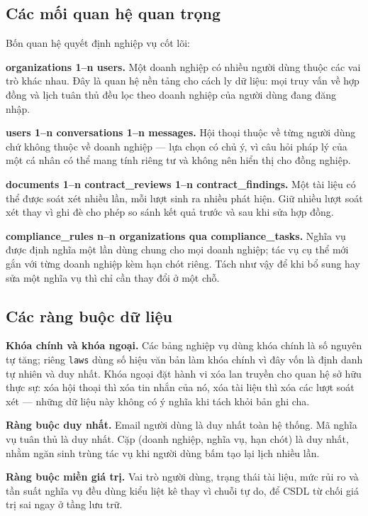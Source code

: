 \documentclass[12pt,a4paper]{report}
\numberwithin{equation}{chapter}
\numberwithin{figure}{chapter}
\numberwithin{table}{chapter}
\begin{document}
\subsection{Các mối quan hệ quan trọng}

Bốn quan hệ quyết định nghiệp vụ cốt lõi:

\textbf{organizations 1--n users.} Một doanh nghiệp có nhiều người dùng thuộc các
vai trò khác nhau. Đây là quan hệ nền tảng cho cách ly dữ liệu: mọi truy vấn về
hợp đồng và lịch tuân thủ đều lọc theo doanh nghiệp của người dùng đang đăng nhập.

\textbf{users 1--n conversations 1--n messages.} Hội thoại thuộc về từng người
dùng chứ không thuộc về doanh nghiệp --- lựa chọn có chủ ý, vì câu hỏi pháp lý của
một cá nhân có thể mang tính riêng tư và không nên hiển thị cho đồng nghiệp.

\textbf{documents 1--n contract\_reviews 1--n contract\_findings.} Một tài liệu có
thể được soát xét nhiều lần, mỗi lượt sinh ra nhiều phát hiện. Giữ nhiều lượt soát
xét thay vì ghi đè cho phép so sánh kết quả trước và sau khi sửa hợp đồng.

\textbf{compliance\_rules n--n organizations qua compliance\_tasks.} Nghĩa vụ được
định nghĩa một lần dùng chung cho mọi doanh nghiệp; tác vụ cụ thể mới gắn với từng
doanh nghiệp kèm hạn chót riêng. Tách như vậy để khi bổ sung hay sửa một nghĩa vụ
thì chỉ cần thay đổi ở một chỗ.

\subsection{Các ràng buộc dữ liệu}

\textbf{Khóa chính và khóa ngoại.} Các bảng nghiệp vụ dùng khóa chính là số nguyên
tự tăng; riêng \texttt{laws} dùng số hiệu văn bản làm khóa chính vì đây vốn là
định danh tự nhiên và duy nhất. Khóa ngoại đặt hành vi xóa lan truyền cho quan hệ
sở hữu thực sự: xóa hội thoại thì xóa tin nhắn của nó, xóa tài liệu thì xóa các
lượt soát xét --- những dữ liệu này không có ý nghĩa khi tách khỏi bản ghi cha.

\textbf{Ràng buộc duy nhất.} Email người dùng là duy nhất toàn hệ thống. Mã nghĩa
vụ tuân thủ là duy nhất. Cặp (doanh nghiệp, nghĩa vụ, hạn chót) là duy nhất, nhằm
ngăn sinh trùng tác vụ khi người dùng bấm tạo lại lịch nhiều lần.

\textbf{Ràng buộc miền giá trị.} Vai trò người dùng, trạng thái tài liệu, mức rủi
ro và tần suất nghĩa vụ đều dùng kiểu liệt kê thay vì chuỗi tự do, để CSDL từ chối
giá trị sai ngay ở tầng lưu trữ.
\end{document}
